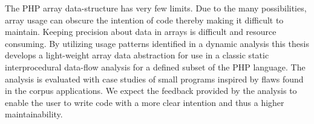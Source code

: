 
The PHP array data-structure has very few limits. Due to the many possibilities, array usage can obscure the intention of code thereby making it difficult to maintain. Keeping precision about data in arrays is difficult and resource consuming. By utilizing usage patterns identified in a dynamic analysis this thesis develops a light-weight array data abstraction for use in a classic static interprocedural data-flow analysis for a defined subset of the PHP language. The analysis is evaluated with case studies of small programs inspired by flaws found in the corpus applications. We expect the feedback provided by the analysis to enable the user to write code with a more clear intention and thus a higher maintainability.

\begin{comment}
Writing code with a clear intention and high maintainability is important for any development project. For the PHP language the many possibilities of the array data-structure can easily hinder those important properties. Even if PHP arrays have endless possible use cases, does the practical uses not exhibit detectable patterns? This thesis aims to answer that question with a dynamical analysis of a corpus of popular PHP applications. Using the patterns identified in the dynamical analysis a data abstraction is developed for use in a classical static interprocedural data-flow analysis for a defined subset of the PHP language. The analysis is evaluated with case studies of small programs inspired by flaws found in the corpus applications. The case studies show how the analysis can provide feedback for the user when code is produced that might hinder the clarity of intention or maintainability.
\end{comment}